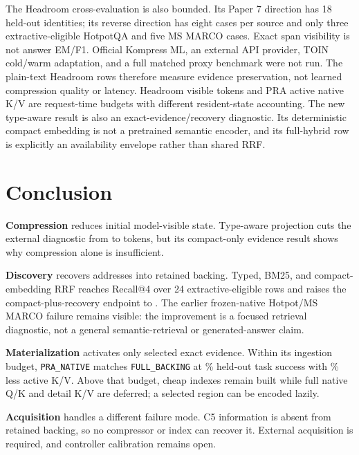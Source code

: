 \documentclass[11pt]{article}
\begin{document}
The Headroom cross-evaluation is also bounded. Its Paper 7 direction has 18
held-out identities; its reverse direction has eight cases per source and only
three extractive-eligible HotpotQA and five MS MARCO cases. Exact span
visibility is not answer EM/F1. Official Kompress ML, an external API provider,
TOIN cold/warm adaptation, and a full matched proxy benchmark were not run.
The plain-text Headroom rows therefore measure evidence preservation, not
learned compression quality or latency. Headroom visible tokens and PRA active
native K/V are request-time budgets with different resident-state accounting.
The new type-aware result is also an exact-evidence/recovery diagnostic. Its
deterministic compact embedding is not a pretrained semantic encoder, and its
full-hybrid row is explicitly an availability envelope rather than shared RRF.

\section{Conclusion}

\textbf{Compression} reduces initial model-visible state. Type-aware projection
cuts the external diagnostic from \PaperSevenCurrentVisible{} to
\PaperSevenAwareVisible{} tokens, but its \PaperSevenAwareCompactOnly{}
compact-only evidence result shows why compression alone is insufficient.

\textbf{Discovery} recovers addresses into retained backing. Typed, BM25, and
compact-embedding RRF reaches \PaperSevenHybridRFour{} Recall@4 over 24
extractive-eligible rows and raises the compact-plus-recovery endpoint to
\PaperSevenAwareRecovered{}. The earlier frozen-native Hotpot/MS MARCO failure
remains visible: the improvement is a focused retrieval diagnostic, not a
general semantic-retrieval or generated-answer claim.

\textbf{Materialization} activates only selected exact evidence. Within its
ingestion budget, \texttt{PRA\_NATIVE} matches \texttt{FULL\_BACKING} at
\PaperSevenCalNativeSuccessPct\% held-out task success with
\PaperSevenCalActiveKVReductionPct\% less active K/V. Above that budget, cheap
indexes remain built while full native Q/K and detail K/V are deferred; a
selected region can be encoded lazily.

\textbf{Acquisition} handles a different failure mode. C5 information is absent
from retained backing, so no compressor or index can recover it. External
acquisition is required, and controller calibration remains open.
\end{document}
